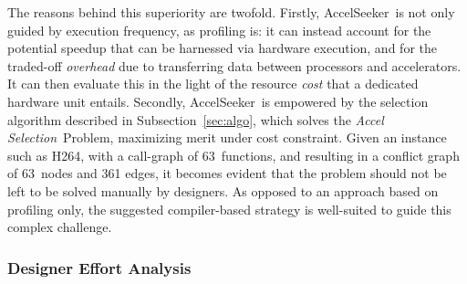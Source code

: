 \documentclass[]{usiinfthesis}
\newcommand{\aseeker}{{AccelSeeker}}
\newcommand{\asprobname}{\emph{Accel Selection}}
\newcommand{\numberOfcandidates}{{63}}
\begin{document}
The reasons behind this superiority are twofold. Firstly, \aseeker\
is not only guided by execution frequency, as profiling is: it can
instead account for the potential speedup that can be harnessed via
hardware execution, and for the traded-off \emph{overhead} due to
transferring data between processors and accelerators. It can then evaluate 
this in the light of the resource \emph{cost} that a dedicated hardware unit 
entails. Secondly, \aseeker\ is empowered by the
selection algorithm described in Subsection~\ref{sec:algo}, which
solves the \asprobname\ Problem, maximizing merit under cost
constraint. Given an instance such as H264, with a call-graph of \numberOfcandidates\
functions, and resulting in a conflict graph of \numberOfcandidates\ nodes and 361
edges, it becomes evident that the problem should not be left to be
solved manually by designers. As opposed to an approach based on
profiling only, the suggested compiler-based strategy is well-suited to
guide this complex challenge.


%
%
%
\subsubsection{Designer Effort Analysis}
\end{document}
